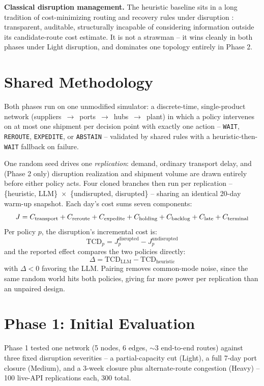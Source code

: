 \documentclass[10pt,twocolumn]{article}
\newcommand{\tcd}{\ensuremath{\mathrm{TCD}}}
\begin{document}
\textbf{Classical disruption management.} The heuristic baseline sits in a long tradition of cost-minimizing routing and recovery rules under disruption \cite{sheffi2005resilient,christopher2004building}: transparent, auditable, structurally incapable of considering information outside its candidate-route cost estimate. It is not a strawman -- it wins cleanly in both phases under Light disruption, and dominates one topology entirely in Phase 2.

\section{Shared Methodology}
\label{sec:method}
Both phases run on one unmodified simulator: a discrete-time, single-product network (suppliers~$\to$~ports~$\to$~hubs~$\to$~plant) in which a policy intervenes on at most one shipment per decision point with exactly one action -- \texttt{WAIT}, \texttt{REROUTE}, \texttt{EXPEDITE}, or \texttt{ABSTAIN} -- validated by shared rules with a heuristic-then-\texttt{WAIT} fallback on failure.

One random seed drives one \emph{replication}: demand, ordinary transport delay, and (Phase 2 only) disruption realization and shipment volume are drawn entirely before either policy acts. Four cloned branches then run per replication -- \{heuristic, LLM\}~$\times$~\{undisrupted, disrupted\} -- sharing an identical 20-day warm-up snapshot. Each day's cost sums seven components:
\begin{equation}
\resizebox{0.95\linewidth}{!}{$J = C_{\text{transport}} + C_{\text{reroute}} + C_{\text{expedite}} + C_{\text{holding}} + C_{\text{backlog}} + C_{\text{late}} + C_{\text{terminal}}$}
\label{eq:cost}
\end{equation}
Per policy $p$, the disruption's incremental cost is:
\begin{equation}
\tcd_p = J^{\text{disrupted}}_p - J^{\text{undisrupted}}_p
\label{eq:tcd}
\end{equation}
and the reported effect compares the two policies directly:
\begin{equation}
\Delta = \tcd_{\text{LLM}} - \tcd_{\text{heuristic}}
\label{eq:delta}
\end{equation}
with $\Delta<0$ favoring the LLM. Pairing removes common-mode noise, since the same random world hits both policies, giving far more power per replication than an unpaired design.

\section{Phase 1: Initial Evaluation}
\label{sec:phase1}
Phase 1 tested one network (5 nodes, 6 edges, $\sim$3 end-to-end routes) against three fixed disruption severities -- a partial-capacity cut (Light), a full 7-day port closure (Medium), and a 3-week closure plus alternate-route congestion (Heavy) -- 100 live-API replications each, 300 total.
\end{document}
